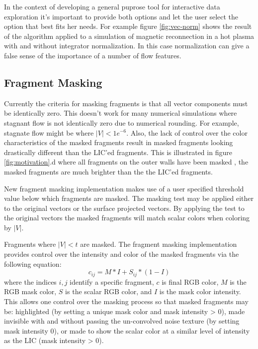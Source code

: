 \documentclass[a4paper,10pt]{article}
\begin{document}
In the context of developing a general puprose tool for interactive data exploration it's important to provide both options and let the user select the option that best fits her needs. For example figure \ref{fig:vec-norm} shows the result of the algorithm applied to a simulation of magnetic reconnection in a hot plasma with and without integrator normalization. In this case normalization can give a false sense of the importance of a number of flow features.

\subsection{Fragment Masking}
\label{sec:mask}
Currently the criteria for masking fragments is that all vector components must be identically zero. This doesn't work for many numerical simulations where stagnant flow is not identically zero due to numerical rounding. For example, stagnate flow might be where $|V|<1e^{-6}$. Also, the lack of control over the color characteristics of the masked fragments result in masked fragments looking drastically different than the LIC'ed fragments. This is illustrated in figure \ref{fig:motivation}.d where all fragments on the outer walls have been masked , the masked fragments are much brighter than the the LIC'ed fragments.

New fragment masking implementation makes use of a user specified threshold value below which fragments are masked. The masking test may be applied either to the original vectors or the surface projected vectors. By applying the test to the original vectors the masked fragments will match scalar colors when coloring by $|V|$. 

Fragments where $|V|<t$ are masked. The fragment masking implementation provides control over the intensity and color of the masked fragments via the following equation:
\begin{equation}
c_{ij} = M * I + S_{ij} * ( 1 - I )
\label{eqn:color-blend}
\end{equation}
where the indices $i,j$ identify a specific fragment, $c$ is final RGB color, $M$ is the RGB mask color, $S$ is the scalar RGB color, and $I$ is the mask color intensity. This allows one control over the masking process so that masked fragments may be: highlighted (by setting a unique mask color and mask intensity > 0), made invisible with and without passing the un-convolved noise texture (by setting mask intensity 0), or made to show the scalar color at a similar level of intensity as the LIC (mask intensity > 0).
\end{document}
